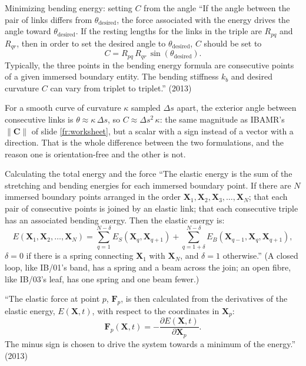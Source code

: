\documentclass[aspectratio=169,11pt]{beamer}
\begin{document}
\begin{frame}{Minimizing bending energy: setting $C$ from the angle}
\label{fr:angle2}
\small ``If the angle between the pair of links differs from $\theta_{\mathrm{desired}}$, the force associated with the energy drives the angle toward $\theta_{\mathrm{desired}}$. If the resting lengths for the links in the triple are $R_{pq}$ and $R_{qr}$, then in order to set the desired angle to $\theta_{\mathrm{desired}}$, $C$ should be set to
\[
  C = R_{pq}\,R_{qr}\,\sin(\theta_{\mathrm{desired}}).
\]
Typically, the three points in the bending energy formula are consecutive points of a given immersed boundary entity. The bending stiffness $k_b$ and desired curvature $C$ can vary from triplet to triplet.'' (2013)
\vspace{2mm}

\footnotesize For a smooth curve of curvature $\kappa$ sampled $\Delta s$ apart, the exterior angle between consecutive links is $\theta \approx \kappa\,\Delta s$, so $C \approx \Delta s^2\,\kappa$: the same magnitude as IBAMR's $\|\mathbf{C}\|$ of slide \ref{fr:worksheet}, but a scalar with a sign instead of a vector with a direction. That is the whole difference between the two formulations, and the reason one is orientation-free and the other is not.
\end{frame}

\begin{frame}{Calculating the total energy and the force}
\label{fr:total}
\small ``The elastic energy is the sum of the stretching and bending energies for each immersed boundary point. If there are $N$ immersed boundary points arranged in the order $\mathbf{X}_1, \mathbf{X}_2, \mathbf{X}_3, \ldots, \mathbf{X}_N$; that each pair of consecutive points is joined by an elastic link; that each consecutive triple has an associated bending energy. Then the elastic energy is:
\[
  E(\mathbf{X}_1, \mathbf{X}_2, \ldots, \mathbf{X}_N) = \sum_{q=1}^{N-\delta} E_S(\mathbf{X}_q, \mathbf{X}_{q+1}) + \sum_{q=1+\delta}^{N-\delta} E_B(\mathbf{X}_{q-1}, \mathbf{X}_q, \mathbf{X}_{q+1}),
\]
$\delta = 0$ if there is a spring connecting $\mathbf{X}_1$ with $\mathbf{X}_N$, and $\delta = 1$ otherwise.'' (A closed loop, like IB/01's band, has a spring and a beam across the join; an open fibre, like IB/03's leaf, has one spring and one beam fewer.)
\vspace{1mm}

``The elastic force at point $p$, $\mathbf{F}_p$, is then calculated from the derivatives of the elastic energy, $E(\mathbf{X}, t)$, with respect to the coordinates in $\mathbf{X}_p$:
\[
  \mathbf{F}_p(\mathbf{X}, t) = -\frac{\partial E(\mathbf{X}, t)}{\partial \mathbf{X}_p}.
\]
The minus sign is chosen to drive the system towards a minimum of the energy.'' (2013)
\end{frame}
\end{document}
